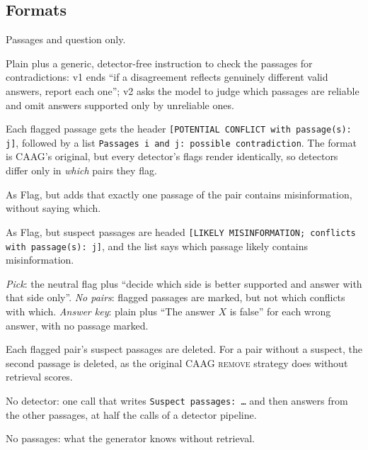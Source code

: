\subsection{Formats}
\label{sec:formats}
\begin{description}[leftmargin=0pt,itemsep=1pt,topsep=2pt]
\item[No flags (plain).] Passages and question only.
\item[Instruction.] Plain plus a generic, detector-free instruction to check the passages for contradictions:
v1 ends ``if a disagreement reflects genuinely different valid answers, report each one''; v2 asks the model to
judge which passages are reliable and omit answers supported only by unreliable ones.
\item[Flag (neutral).] Each flagged passage gets the header \texttt{[POTENTIAL CONFLICT with passage(s): j]}, followed by a list
\texttt{Passages i and j: possible contradiction}. The format is CAAG's original, but every detector's
flags render identically, so detectors differ only in \emph{which} pairs they flag.
\item[One-wrong flag.] As Flag, but adds that exactly one passage of the pair contains misinformation, without saying
which.
\item[Directional flag.] As Flag, but suspect passages are headed \texttt{[LIKELY MISINFORMATION; conflicts with
passage(s): j]}, and the list says which passage likely contains misinformation.
\item[Controls.] \emph{Pick}: the neutral flag plus ``decide which side is better supported and answer with that
side only''. \emph{No pairs}: flagged passages are marked, but not which conflicts
with which. \emph{Answer key}: plain plus ``The answer $X$ is false'' for each wrong answer, with no passage marked.
\item[Remove (suspect).] Each flagged pair's suspect passages are deleted. For a pair without a suspect, the
second passage is deleted, as the original CAAG \textsc{remove} strategy does without retrieval scores.
\item[Single call.] No detector: one call that writes \texttt{Suspect passages: \dots} and then answers from
the other passages, at half the calls of a detector pipeline.
\item[Closed book.] No passages: what the generator knows without retrieval.
\end{description}


